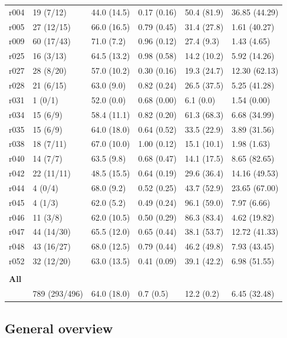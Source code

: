 \documentclass[10pt]{article}
\begin{document}
\begin{table}[h]
\begin{tabular}{llllll}
r004 & 19 (7/12) & 44.0 (14.5) & 0.17 (0.16) & 50.4 (81.9) & 36.85 (44.29) \\
r005 & 27 (12/15) & 66.0 (16.5) & 0.79 (0.45) & 31.4 (27.8) & 1.61 (40.27) \\
r009 & 60 (17/43) & 71.0 (7.2) & 0.96 (0.12) & 27.4 (9.3) & 1.43 (4.65) \\
r025 & 16 (3/13) & 64.5 (13.2) & 0.98 (0.58) & 14.2 (10.2) & 5.92 (14.26) \\
r027 & 28 (8/20) & 57.0 (10.2) & 0.30 (0.16) & 19.3 (24.7) & 12.30 (62.13) \\
r028 & 21 (6/15) & 63.0 (9.0) & 0.82 (0.24) & 26.5 (37.5) & 5.25 (41.28) \\
r031 & 1 (0/1) & 52.0 (0.0) & 0.68 (0.00) & 6.1 (0.0) & 1.54 (0.00) \\
r034 & 15 (6/9) & 58.4 (11.1) & 0.82 (0.20) & 61.3 (68.3) & 6.68 (34.99) \\
r035 & 15 (6/9) & 64.0 (18.0) & 0.64 (0.52) & 33.5 (22.9) & 3.89 (31.56) \\
r038 & 18 (7/11) & 67.0 (10.0) & 1.00 (0.12) & 15.1 (10.1) & 1.98 (1.63) \\
r040 & 14 (7/7) & 63.5 (9.8) & 0.68 (0.47) & 14.1 (17.5) & 8.65 (82.65) \\
r042 & 22 (11/11) & 48.5 (15.5) & 0.64 (0.19) & 29.6 (36.4) & 14.16 (49.53) \\
r044 & 4 (0/4) & 68.0 (9.2) & 0.52 (0.25) & 43.7 (52.9) & 23.65 (67.00) \\
r045 & 4 (1/3) & 62.0 (5.2) & 0.49 (0.24) & 96.1 (59.0) & 7.97 (6.66) \\
r046 & 11 (3/8) & 62.0 (10.5) & 0.50 (0.29) & 86.3 (83.4) & 4.62 (19.82) \\
r047 & 44 (14/30) & 65.5 (12.0) & 0.65 (0.44) & 38.1 (53.7) & 12.72 (41.33) \\
r048 & 43 (16/27) & 68.0 (12.5) & 0.79 (0.44) & 46.2 (49.8) & 7.93 (43.45) \\
r052 & 32 (12/20) & 63.0 (13.5) & 0.41 (0.09) & 39.1 (42.2) & 6.98 (51.55) \\
 & & & & &\\
\textbf{All}  & & & & &\\
\arrayrulecolor{black!30}\midrule
& 789 (293/496) & 64.0 (18.0) & 0.7 (0.5) & 12.2 (0.2) & 6.45 (32.48) \\
\bottomrule
\end{tabular}
\end{table}

\subsection{General overview}
\end{document}
